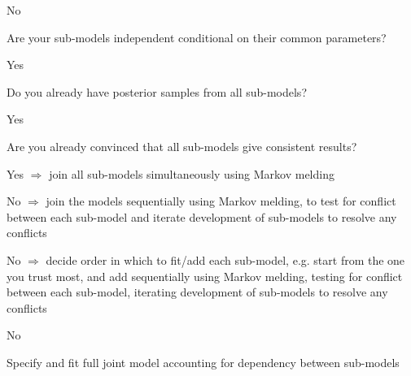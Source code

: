 \documentclass{article}
\begin{document}
\begin{tree}
\begin{tree}
\begin{tree}
\begin{tree}
\begin{tree}
\begin{tree}
                    \end{tree}
                \end{tree}
            \end{tree}
        \end{tree}
        \item No
        \begin{tree}
        \item Are your sub-models independent conditional on their common parameters?
        \begin{tree}
            \item Yes
            \begin{tree}
                \item Do you already have posterior samples from all sub-models?
                \begin{tree}
                    \item Yes
                    \begin{tree}
                        \item Are you already convinced that all sub-models give consistent results?
                        \begin{tree}
                            \item Yes $\Rightarrow$ join all sub-models simultaneously using Markov melding
                            \item No $\Rightarrow$ join the models sequentially using Markov melding, to test for conflict between each sub-model and iterate development of sub-models to resolve any conflicts
                        \end{tree}
                    \end{tree}
                    \item No $\Rightarrow$ decide order in which to fit/add each sub-model, e.g. start from the one you trust most, and add sequentially using Markov melding, testing for conflict between each sub-model, iterating development of sub-models to resolve any conflicts
                \end{tree}
            \end{tree}
            \item No
            \begin{tree}
                \item Specify and fit full joint model accounting for dependency between sub-models
            \end{tree}
        \end{tree}
        \end{tree}
    \end{tree}
\end{tree}
\end{document}
